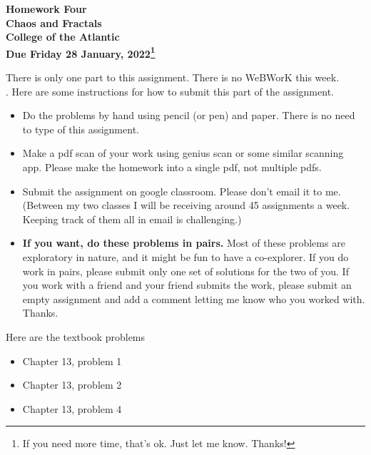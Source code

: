 \documentclass[12pt]{article}
\begin{document}
\pagestyle{empty}
 
\begin{center}
{\LARGE {\bf Homework Four}}\\
\bigskip
{\Large {\bf Chaos and Fractals}}\\
\bigskip
{\Large {\bf College of the Atlantic}}\\
\bigskip
{ {\bf Due Friday 28 January, 2022\footnote{If you need more time,
      that's ok. Just let me know. Thanks!}}}\\  
\end{center}
\medskip



\noindent There is only one part to this assignment. There is no
WeBWorK this week.\\ 


.  Here are some
instructions for how to submit this part of the assignment.
\begin{itemize}
\item Do the problems by hand using pencil (or pen) and paper.
  There is no need to type of this assignment.
\item Make a pdf scan of your work using genius scan or some
  similar scanning app.  Please make the homework into a single
  pdf, not multiple pdfs.
\item Submit the assignment on google classroom.  Please don't
  email it to me.  (Between my two classes I will be receiving
  around 45 assignments a week.  Keeping track of them all in email
  is challenging.)
\item {\bf If you want, do these problems in pairs.} Most of these
  problems are exploratory in nature, and it might be fun to have a
  co-explorer. If you do work in pairs,
  please submit only one set of solutions for the two of you.  If you
  work with a friend and your friend submits the work, please submit
  an empty assignment and add a comment letting me know who you worked
  with.  Thanks.
\end{itemize}

\noindent Here are the textbook problems

\begin{itemize}
\setlength{\itemsep}{-1mm}
\item Chapter 13, problem 1
\item Chapter 13, problem 2
\item Chapter 13, problem 4
\end{itemize}
\end{document}
